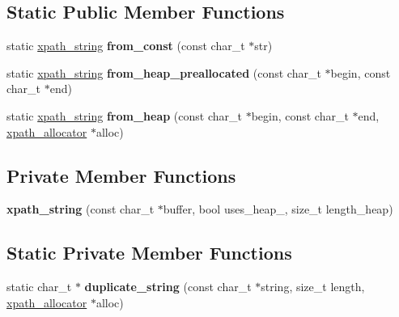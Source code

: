 \subsection*{Static Public Member Functions}
\begin{DoxyCompactItemize}
\item 
\mbox{\label{classxpath__string_a6dce01c6b3a949c3c4c886e6be44931e}} 
static \hyperlink{classxpath__string}{xpath\+\_\+string} {\bfseries from\+\_\+const} (const char\+\_\+t $\ast$str)
\item 
\mbox{\label{classxpath__string_a37e13c2dc384cac842cee3870e9e9e23}} 
static \hyperlink{classxpath__string}{xpath\+\_\+string} {\bfseries from\+\_\+heap\+\_\+preallocated} (const char\+\_\+t $\ast$begin, const char\+\_\+t $\ast$end)
\item 
\mbox{\label{classxpath__string_aaf1229b7a7ae918b41bf995df16c8896}} 
static \hyperlink{classxpath__string}{xpath\+\_\+string} {\bfseries from\+\_\+heap} (const char\+\_\+t $\ast$begin, const char\+\_\+t $\ast$end, \hyperlink{classxpath__allocator}{xpath\+\_\+allocator} $\ast$alloc)
\end{DoxyCompactItemize}
\subsection*{Private Member Functions}
\begin{DoxyCompactItemize}
\item 
\mbox{\label{classxpath__string_a93704af22ba77956cae8ec65f84658d8}} 
{\bfseries xpath\+\_\+string} (const char\+\_\+t $\ast$buffer, bool uses\+\_\+heap\+\_\+, size\+\_\+t length\+\_\+heap)
\end{DoxyCompactItemize}
\subsection*{Static Private Member Functions}
\begin{DoxyCompactItemize}
\item 
\mbox{\label{classxpath__string_a57c53a0b67fecb1845c31215d8ee206b}} 
static char\+\_\+t $\ast$ {\bfseries duplicate\+\_\+string} (const char\+\_\+t $\ast$string, size\+\_\+t length, \hyperlink{classxpath__allocator}{xpath\+\_\+allocator} $\ast$alloc)
\end{DoxyCompactItemize}
